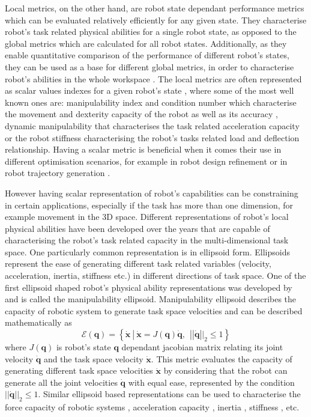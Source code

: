 Local metrics, on the other hand, are robot state dependant performance metrics which can be evaluated relatively efficiently for any given state. They characterise robot's task related physical abilities for a single robot state, as opposed to the global metrics which are calculated for all robot states. 
Additionally, as they enable quantitative comparison of the performance of different robot's states, they can be used as a base for different global metrics, in order to characterise robot's abilities in the whole workspace \cite{Zacharias2007}. The local metrics are often represented as scalar values indexes for a given robot's state \cite{Patel2015}, where some of the most well known ones are: manipulability index \cite{yoshikawa1985manipulability} and condition number \cite{Gosselin1991} which characterise the movement and dexterity capacity of the robot as well as its accuracy \cite{merlet_jacobian_2006}, dynamic manipulability \cite{yoshikawa1985dynamic} that characterises the task related acceleration capacity or the robot stiffness \cite{PASHKEVICH2011662} characterising the robot's tasks related load and deflection relationship.
Having a scalar metric is beneficial when it comes their use in different optimisation scenarios, for example in robot design refinement \cite{kucuk2005robot} or in robot trajectory generation \cite{Guilamo2006}. 

However having scalar representation of robot's capabilities can be constraining in certain applications, especially if the task has more than one dimension, for example movement in the 3D space. Different representations of robot's local physical abilities have been developed over the years that are capable of characterising the robot's task related capacity in the multi-dimensional task space. One particularly common representation is in ellipsoid form. Ellipsoids represent the ease of generating different task related variables (velocity, acceleration, inertia, stiffness etc.) in different directions of task space. One of the first ellipsoid shaped robot's physical ability representations was developed by \citet{yoshikawa1985manipulability} and is called the manipulability ellipsoid. Manipulability ellipsoid describes the capacity of robotic system to generate task space velocities and can be described mathematically as
\begin{equation}
    \mathcal{E}(\bm{q}) = \left\{ \dot{\bm{x}} ~|~ \dot{\bm{x}} = J(\bm{q})\dot{\bm{q}},~~ ||\dot{\bm{q}}||_2 \leq 1 \right\}
\end{equation}
where $J(\bm{q})$ is robot's state $\bm{q}$ dependant jacobian matrix relating its joint velocity $\dot{\bm{q}}$ and the task space velocity $\dot{\bm{x}}$. This metric evaluates the capacity of generating different task space velocities $\dot{\bm{x}}$ by considering that the robot can generate all the joint velocities $\dot{\bm{q}}$ with equal ease, represented by the condition $||\dot{\bm{q}}||_2 \leq 1$. Similar ellipsoid based representations can be used to characterise the force capacity of robotic systems \cite{chiacchio_global_1991}, acceleration capacity \cite{yoshikawa1985dynamic}, inertia \cite{Asada1984}, stiffness \cite{ajoudani2015role}, etc. 

